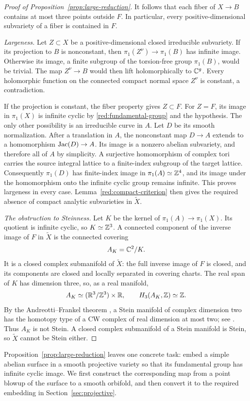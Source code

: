 \begin{proof}[Proof of Proposition~\ref{prop:large-reduction}]
It follows that each fiber of $X\to B$ contains at most three points
outside $F$.  In particular, every positive-dimensional subvariety of
a fiber is contained in $F$.

\smallskip
\noindent\emph{Largeness.}
Let $Z\subset X$ be a positive-dimensional closed irreducible
subvariety.  If its projection to $B$ is nonconstant, then
$\pi_1(Z^\nu)\to\pi_1(B)$ has infinite image.  Otherwise its image,
a finite subgroup of the torsion-free group $\pi_1(B)$, would be
trivial.  The map $Z^\nu\to B$ would then lift holomorphically to
$\mathbb C^g$.  Every holomorphic function on the connected compact normal
space $Z^\nu$ is constant, a contradiction.

If the projection is constant, the fiber property gives $Z\subset F$.
For $Z=F$, its image in $\pi_1(X)$ is infinite cyclic by
\eqref{red:fundamental-group} and the hypothesis.  The only other
possibility is an irreducible curve in $A$.  Let $D$ be its smooth
normalization.  After a translation in $A$, the nonconstant map
$D\to A$ extends to a homomorphism $\operatorname{Jac}(D)\to A$.  Its image is a
nonzero abelian subvariety, and therefore all of $A$ by simplicity.
A surjective homomorphism of complex tori carries the source integral
lattice to a finite-index subgroup of the target lattice.  Consequently
$\pi_1(D)$ has finite-index image in $\pi_1(A)\simeq\mathbb Z^4$, and its
image under the homomorphism onto the infinite cyclic group remains
infinite.  This proves largeness in every case.  Lemma~\ref{red:compact-criterion}
then gives the required absence of compact analytic subvarieties in
$\widetilde X$.

\smallskip
\noindent\emph{The obstruction to Steinness.}
Let $K$ be the kernel of $\pi_1(A)\to\pi_1(X)$.  Its quotient is
infinite cyclic, so $K\simeq\mathbb Z^3$.  A connected component of the
inverse image of $F$ in $\widetilde X$ is the connected covering
\[
 A_K=\mathbb C^2/K.
\]
It is a closed complex submanifold of $\widetilde X$: the full inverse
image of $F$ is closed, and its components are closed and locally
separated in covering charts.  The real span of $K$ has dimension
three, so, as a real manifold,
\[
 A_K\simeq(\mathbb R^3/\mathbb Z^3)\times\mathbb R,
 \qquad H_3(A_K,\mathbb Z)\simeq\mathbb Z.
\]
By the Andreotti--Frankel theorem \cite{AndreottiFrankel1959}, a Stein
manifold of complex dimension two has the homotopy type of a CW complex of real dimension at most
two; see \cite[Theorem~7.2]{MilnorMorse}.  Thus $A_K$ is not Stein.
A closed complex submanifold of a Stein manifold is Stein, so
$\widetilde X$ cannot be Stein either.
\end{proof}

Proposition~\ref{prop:large-reduction} leaves one concrete task: embed a
simple abelian surface in a smooth projective variety so that its
fundamental group has infinite cyclic image.  We first construct the
corresponding map from a point blowup of the surface to a smooth
orbifold, and then convert it to the required embedding in
Section~\ref{sec:projective}.
